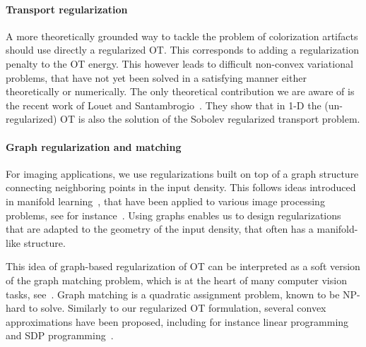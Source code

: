 

\paragraph{Transport regularization}

A more theoretically grounded way to tackle the problem of colorization artifacts should use directly a regularized OT. This corresponds to adding a regularization penalty to the OT energy. This however leads to difficult non-convex variational problems, that have not yet been solved in a satisfying manner either theoretically or numerically. The only theoretical contribution we are aware of is the recent work of Louet and Santambrogio~\cite{louet-regularizaton-1d}. They show that in 1-D the (un-regularized) OT is also the solution of the Sobolev regularized transport problem.

\paragraph{Graph regularization and matching}

For imaging applications, we use regularizations built on top of a graph structure connecting neighboring points in the input density. This follows ideas introduced in manifold learning~\cite{isomap}, that have been applied to various image processing problems, see for instance~\cite{elmoataz-graph}. Using graphs enables us to design regularizations that are adapted to the geometry of the input density, that often has a manifold-like structure. 

This idea of graph-based regularization of OT can be interpreted as a soft version of the graph matching problem, which is at the heart of many computer vision tasks, see~\cite{Belongie-graph-match,Yefeng-graph-match}. Graph matching is a quadratic assignment problem, known to be NP-hard to solve.  Similarly to our regularized OT formulation, several convex approximations have been proposed, including for instance linear programming~\cite{Almohamad-graph-match} and SDP programming~\cite{schellewald-ivc}. 

